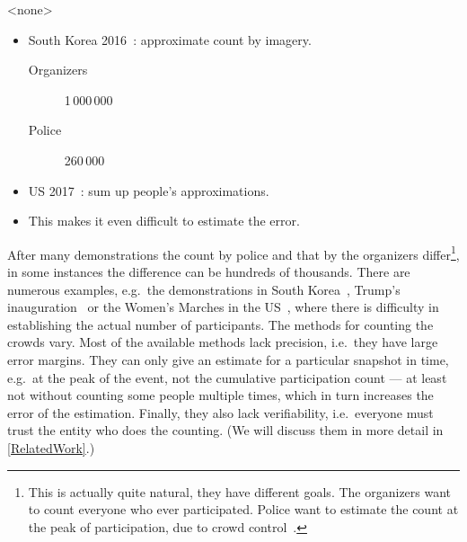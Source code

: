\mode<none>{%
\begin{frame}
  \begin{example}
    \begin{itemize}
      \item South Korea 2016~\cite{2016DemonstrationsInSeoul}:
        approximate count by imagery.
        \begin{description}
          \item[Organizers] 1\,000\,000
          \item[Police] 260\,000
        \end{description}

        \pause{}

      \item US 2017~\cite{2017WomensMarchesInUS}:
        sum up people's approximations.
      \item This makes it even difficult to estimate the error.
    \end{itemize}
  \end{example}
\end{frame}
}

After many demonstrations the count by police and that by the organizers 
differ\footnote{%
  This is actually quite natural, they have different goals.
  The organizers want to count everyone who ever participated.
  Police want to estimate the count at the peak of participation, due to crowd 
  control~\cite{2016DemonstrationsInSeoul}.
}, in some instances the difference can be hundreds of thousands.
There are numerous examples, e.g.\ the demonstrations in South 
Korea~\cite{2016DemonstrationsInSeoul}, Trump's 
inauguration~\cite{HowWillWeKnowTrumpInauguralCrowdSize} or the Women's Marches 
in the US~\cite{2017WomensMarchesInUS}, where there is difficulty in 
establishing the actual number of participants.
The methods for counting the crowds vary.
Most of the available methods lack precision, i.e.\ they have large error 
margins.
They can only give an estimate for a particular snapshot in time, e.g.\ at the 
peak of the event, not the cumulative participation count --- at least not 
without counting some people multiple times, which in turn increases the error 
of the estimation.
Finally, they also lack verifiability, i.e.\ everyone must trust the entity who
does the counting.
(We will discuss them in more detail in \cref{RelatedWork}.)

